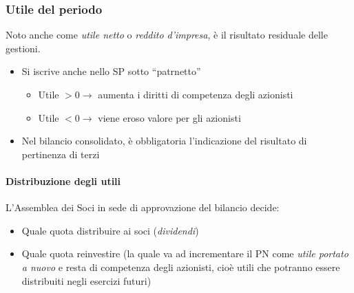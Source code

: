 \documentclass[10pt,a4paper,fleqn,oneside]{book}
\begin{document}
\subsubsection{Utile del periodo}
Noto anche come \emph{utile netto} o \emph{reddito d'impresa}, è il risultato residuale
delle gestioni.

\begin{itemize}
    \item Si iscrive anche nello SP sotto ``\gls{patrnetto}''
    \begin{itemize}
        \item Utile $> 0 \rightarrow$ aumenta i diritti di competenza degli azionisti
        \item Utile $< 0 \rightarrow$ viene eroso valore per gli azionisti
    \end{itemize}
    \item Nel bilancio consolidato, è obbligatoria l’indicazione del risultato di
    pertinenza di terzi
\end{itemize}

\paragraph{Distribuzione degli utili}
L’Assemblea dei Soci in sede di approvazione del bilancio decide:
\begin{itemize}
    \item Quale quota distribuire ai soci (\emph{dividendi})
    \item Quale quota reinvestire (la quale va ad incrementare il PN come
    \emph{utile portato a nuovo} e resta di competenza degli azionisti, cioè utili che potranno essere
    distribuiti negli esercizi futuri)
\end{itemize}



\end{document}
